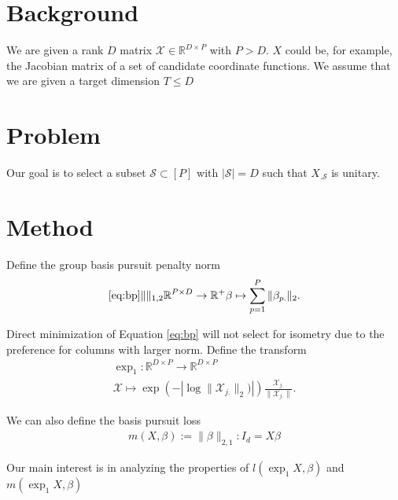 \documentclass[a4paper,11pt]{article}
\begin{document}
\section{Background}

We are given a rank $D$ matrix $\mathcal X \in \mathbb R^{D \times P}$ with $P > D$.
$X$ could be, for example, the Jacobian matrix of a set of candidate coordinate functions.
We assume that we are given a target dimension $T \leq D$

\section{Problem}

Our goal is to select a subset $\mathcal S \subset [P]$ with $|\mathcal S| = D$ such that $X_{. \mathcal S}$ is unitary.

\section{Method}

Define the group basis pursuit penalty norm %
\begin{align}
\ref{eq:bp}
\|\|_{1,2} \mathbb R^{P \times D} \to \mathbb R^+
\beta \mapsto  \sum_{p=1}^P  \|\beta_{p.}\|_2.
\end{align}


Direct minimization of Equation \ref{eq:bp} will not select for isometry due to the preference for columns with larger norm.
Define the transform
\begin{align}
\exp_1: \mathbb R^{D \times P} \to \mathbb R^{D \times P} \\ 
\mathcal X \mapsto \exp (- | \log \|{\mathcal X }_{j.}\|_2)|) \frac{{\mathcal X }_{j.}}{\|{\mathcal X }_{j.}\|}.
\end{align}



We can also define the basis pursuit loss
\begin{align}
m (X, \beta) := \|\beta\|_{2,1} :  I_d = X\beta
\end{align}

Our main interest is in analyzing the properties of $l(\exp_1 X,  \beta)$ and $m(\exp_1 X,  \beta)$ 
\end{document}
